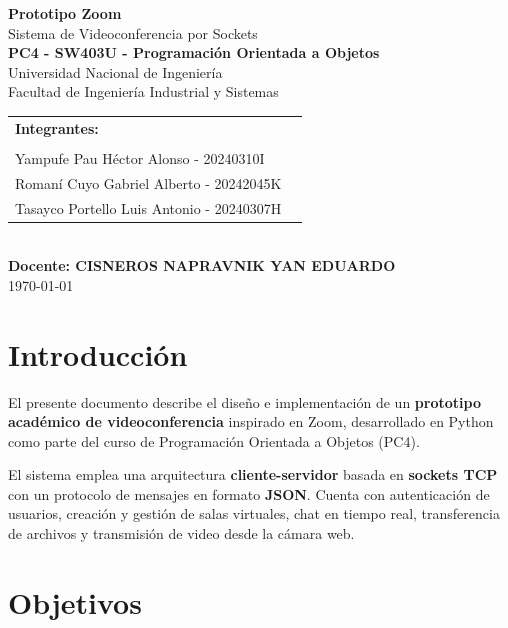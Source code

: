 \documentclass[12pt,a4paper]{article}
\begin{document}
\onecolumn
\begin{titlepage}
    \centering
    \vspace*{2cm}
    {\Huge \textbf{Prototipo Zoom}}\\[0.5cm]
    {\Large Sistema de Videoconferencia por Sockets}\\[1.5cm]
    {\large \textbf{PC4 - SW403U - Programaci\'on Orientada a Objetos}}\\[0.5cm]
    {\large Universidad Nacional de Ingeniería}\\[0.3cm]
    {\large Facultad de Ingenier\'ia Industrial y Sistemas}\\[2cm]

    \begin{tabular}{ll}
        \textbf{Integrantes:} & \\
        & \\ Yampufe Pau Héctor Alonso - 20240310I
        & \\ Romaní Cuyo Gabriel Alberto - 20242045K
        & \\ Tasayco Portello Luis Antonio - 20240307H
    \end{tabular}\\[2cm]

    \textbf{Docente: CISNEROS NAPRAVNIK YAN EDUARDO}\\[1.8cm]

    \today
\end{titlepage}

\tableofcontents
\newpage

\section{Introducci\'on}

El presente documento describe el dise\~no e implementaci\'on de un \textbf{prototipo acad\'emico de videoconferencia} inspirado en Zoom, desarrollado en Python como parte del curso de Programaci\'on Orientada a Objetos (PC4).

El sistema emplea una arquitectura \textbf{cliente-servidor} basada en \textbf{sockets TCP} con un protocolo de mensajes en formato \textbf{JSON}. Cuenta con autenticaci\'on de usuarios, creaci\'on y gesti\'on de salas virtuales, chat en tiempo real, transferencia de archivos y transmisi\'on de video desde la c\'amara web.

\section{Objetivos}
\end{document}
